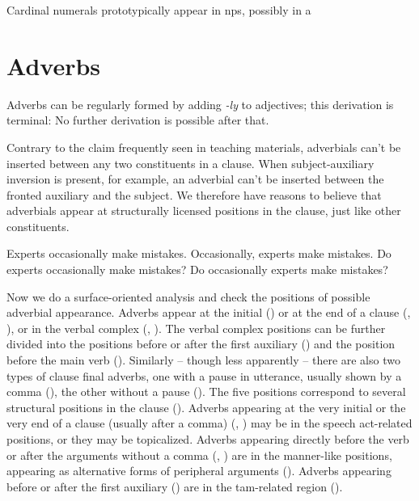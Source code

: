 \documentclass[UTF8, a4paper, oneside, scheme=plain, 12pt]{ctexbook}
\newcommand{\form}[1]{\emph{#1}}
\begin{document}
Cardinal numerals prototypically appear in \acs{np}s,
possibly in a 

\section{Adverbs}\label{sec:pos.adverb}

Adverbs can be regularly formed by adding \form{-ly} to adjectives;
this derivation is terminal:
No further derivation is possible after that.

Contrary to the claim frequently seen in teaching materials, 
adverbials can't be inserted between any two constituents in a clause.
When subject-auxiliary inversion is present, 
for example, 
an adverbial can't be inserted between the fronted auxiliary and the subject.
We therefore have reasons to believe that adverbials appear at structurally licensed positions in the clause, 
just like other constituents.

\begin{exe}
    \ex Experts occasionally make mistakes.
    \ex Occasionally, experts make mistakes.
    \ex Do experts occasionally make mistakes?
    \ex *Do occasionally experts make mistakes?
\end{exe}

Now we do a surface-oriented analysis and check the positions of possible adverbial appearance.
Adverbs appear at the initial () or
at the end of a clause (, ), 
or in the verbal complex (, ).
The verbal complex positions can be further divided into 
the positions before or after the first auxiliary ()
and the position before the main verb ().
Similarly -- though less apparently -- 
there are also two types of clause final adverbs,
one with a pause in utterance, usually shown by a comma (),
the other without a pause ().
The five positions correspond to several structural positions in the clause  
().
Adverbs appearing at the very initial or the very end of a clause (usually after a comma)
(, ) 
may be in the speech act-related positions,
or they may be topicalized.
Adverbs appearing directly before the verb 
or after the arguments without a comma 
(, ) 
are in the manner-like positions,
appearing as alternative forms of peripheral arguments
().
Adverbs appearing before or after the first auxiliary () 
are in the \acs{tam}-related region ().
\end{document}
